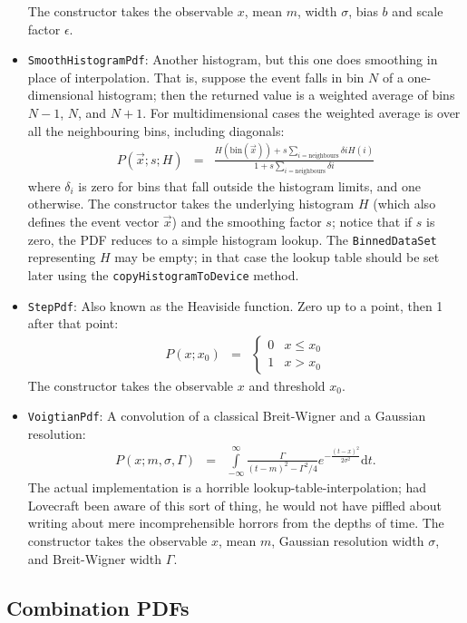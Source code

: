 \documentclass[12pt,pdflatex]{article}
\begin{document}
\begin{itemize}
The constructor takes the observable $x$, mean $m$, width $\sigma$, bias $b$ and
scale factor $\epsilon$. 
\item \texttt{SmoothHistogramPdf}: Another histogram, but this one does
smoothing in place of interpolation. That is, suppose the event falls in bin $N$ of
a one-dimensional histogram; then the returned value is a weighted average of bins
$N-1$, $N$, and $N+1$. For multidimensional cases the weighted average is over all
the neighbouring bins, including diagonals:
\begin{eqnarray}
P(\vec x;s;H) &=& \frac{H(\mathrm{bin}(\vec x)) + s\sum\limits_{i=\mathrm{neighbours}}\delta{i}H(i)}{1 + s\sum\limits_{i=\mathrm{neighbours}}\delta{i}}
\end{eqnarray}
where $\delta_i$ is zero for bins that fall outside the histogram limits,
and one otherwise. The constructor takes the underlying histogram $H$ (which also
defines the event vector $\vec x$) and the smoothing
factor $s$; notice that if $s$ is zero, the PDF reduces to a simple histogram lookup. 
The \texttt{BinnedDataSet} representing $H$ may be empty; in that case the lookup table should
be set later using the \texttt{copyHistogramToDevice} method. 
\item \texttt{StepPdf}: Also known as the Heaviside function. Zero up to a point, 
then 1 after that point:
\begin{eqnarray}
P(x;x_0) &=& \left\{
\begin{matrix}
0 & x \le x_0 \\ 
1 & x > x_0 
\end{matrix}
\right.
\end{eqnarray}
The constructor takes the observable $x$ and threshold $x_0$. 
\item \texttt{VoigtianPdf}: A convolution of a classical Breit-Wigner
and a Gaussian resolution:
\begin{eqnarray}
P(x;m,\sigma,\Gamma) &=& \int\limits_{-\infty}^\infty\frac{\Gamma}{(t-m)^2-\Gamma^2/4} e^{-\frac{(t-x)^2}{2\sigma^2}}\mathrm{d}t. 
\end{eqnarray}
The actual implementation is a horrible lookup-table-interpolation;
had Lovecraft been aware of this sort of thing, he would not have piffled
about writing about mere incomprehensible horrors from the depths of time.
The constructor takes the observable $x$, mean $m$, Gaussian resolution width
$\sigma$, and Breit-Wigner width $\Gamma$. 
\end{itemize}

\subsection{Combination PDFs}
\end{document}
